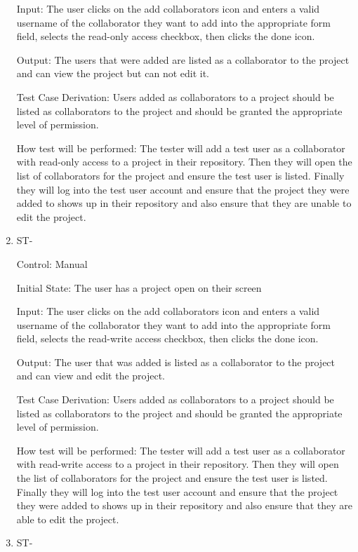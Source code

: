 \documentclass[12pt, titlepage]{article}
\newcounter{TESTID}
\newcommand\TESTNUM{\stepcounter{TESTID}\theTESTID}
\begin{document}
\begin{enumerate}
		Input: The user clicks on the add collaborators icon and enters a valid username of the collaborator they want to add into the appropriate form field, selects the read-only access checkbox, then clicks the done icon.
		
		Output: The users that were added are listed as a collaborator to the project and can view the project but can not edit it.
		
		Test Case Derivation: Users added as collaborators to a project should be listed as collaborators to the project and should be granted the appropriate level of permission.
		
		How test will be performed: The tester will add a test user as a collaborator with read-only access to a project in their repository. Then they will open the list of collaborators for the project and ensure the test user is listed. Finally they will log into the test user account and ensure that the project they were added to shows up in their repository and also ensure that they are unable to edit the project.
		
		\item{ST-\TESTNUM\\}
		
		Control: Manual
		
		Initial State: The user has a project open on their screen
		
		Input: The user clicks on the add collaborators icon and enters a valid username of the collaborator they want to add into the appropriate form field, selects the read-write access checkbox, then clicks the done icon.
		
		Output: The user that was added is listed as a collaborator to the project and can view and edit the project.
		
		Test Case Derivation: Users added as collaborators to a project should be listed as collaborators to the project and should be granted the appropriate level of permission.
		
		How test will be performed: The tester will add a test user as a collaborator with read-write access to a project in their repository. Then they will open the list of collaborators for the project and ensure the test user is listed. Finally they will log into the test user account and ensure that the project they were added to shows up in their repository and also ensure that they are able to edit the project.
		
		\item{ST-\TESTNUM\\}
		

\end{enumerate}
\end{document}
